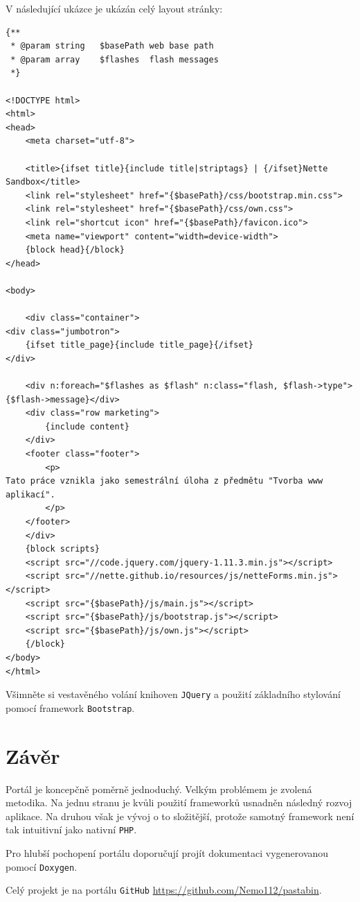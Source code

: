 \documentclass[a4paper,10pt]{report}
\begin{document}
V následující ukázce je ukázán celý layout stránky:

\begin{verbatim}
{**
 * @param string   $basePath web base path
 * @param array    $flashes  flash messages
 *}

<!DOCTYPE html>
<html>
<head>
	<meta charset="utf-8">

	<title>{ifset title}{include title|striptags} | {/ifset}Nette Sandbox</title>
	<link rel="stylesheet" href="{$basePath}/css/bootstrap.min.css">
	<link rel="stylesheet" href="{$basePath}/css/own.css">
	<link rel="shortcut icon" href="{$basePath}/favicon.ico">
	<meta name="viewport" content="width=device-width">
	{block head}{/block}
</head>

<body>

    <div class="container">
<div class="jumbotron">
	{ifset title_page}{include title_page}{/ifset}
</div>

	<div n:foreach="$flashes as $flash" n:class="flash, $flash->type">{$flash->message}</div>
	<div class="row marketing">
		{include content}
	</div>
 	<footer class="footer">
		<p>
Tato práce vznikla jako semestrální úloha z předmětu "Tvorba www aplikací".
		</p>
	</footer>
    </div>
	{block scripts}
	<script src="//code.jquery.com/jquery-1.11.3.min.js"></script>
	<script src="//nette.github.io/resources/js/netteForms.min.js"></script>
	<script src="{$basePath}/js/main.js"></script>
	<script src="{$basePath}/js/bootstrap.js"></script>
	<script src="{$basePath}/js/own.js"></script>
	{/block}
</body>
</html>
\end{verbatim}

Všimněte si vestavěného volání knihoven \texttt{JQuery} a použití základního stylování pomocí framework \texttt{Bootstrap}.

\chapter{Závěr}

Portál je koncepčně poměrně jednoduchý. Velkým problémem je zvolená metodika. Na jednu stranu je kvůli použití frameworků usnadněn následný rozvoj aplikace. Na druhou však je vývoj o to složitější, protože samotný framework není tak intuitivní jako nativní \texttt{PHP}.

Pro hlubší pochopení portálu doporučují projít dokumentaci vygenerovanou pomocí \texttt{Doxygen}.

Celý projekt je na portálu \texttt{GitHub} \url{https://github.com/Nemo112/pastabin}.
\end{document}

